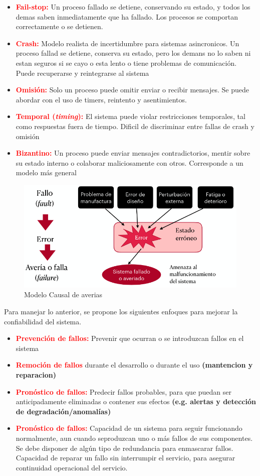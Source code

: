 \begin{itemize}
    \item \textcolor{red}{\textbf{Fail-stop:}} Un proceso fallado se detiene, conservando su estado, y todos los demas saben inmediatamente que ha fallado. Los procesos se comportan correctamente o se detienen.
    \item \textcolor{red}{\textbf{Crash:}} Modelo realista de incertidumbre para sistemas asincronicos. Un proceso fallad se detiene, conserva su estado, pero los demans no lo saben ni estan seguros si se cayo o esta lento o tiene problemas de comunicación. Puede recuperarse y reintegrarse al sistema
    \item \textcolor{red}{\textbf{Omisión:}} Solo un proceso puede omitir enviar o recibir mensajes. Se puede abordar con el uso de timers, reintento y asentimientos.
    \item \textcolor{red}{\textbf{Temporal (\textit{timing}):}} El sistema puede violar restricciones temporales, tal como respuestas fuera de tiempo. Dificil de discriminar entre fallas de crash y omisión
    \item \textcolor{red}{\textbf{Bizantino:}} Un proceso puede enviar mensajes contradictorios, mentir sobre su estado interno o colaborar maliciosamente con otros. Corresponde a un modelo más general
\end{itemize}

\begin{figure}[H]
    \centering
    \includegraphics[width=0.48\linewidth]{img/Modelo_Causal_de_averias.png}
    \caption{Modelo Causal de averias}\label{fig:1761579857293}
\end{figure}


Para manejar lo anterior, se propone los siguientes enfoques para mejorar la confiabilidad del sistema.

\begin{itemize}
    \item \textcolor{red}{\textbf{Prevención de fallos:}} Prevenir que ocurran o se introduzcan fallos en el sistema
    \item \textcolor{red}{\textbf{Remoción de fallos}} durante el desarrollo o durante el uso \textbf{(mantencion y reparacion)}
    \item \textcolor{red}{\textbf{Pronóstico de fallos:}} Predecir fallos probables, para que puedan ser anticipadamente eliminadas o contener sus efectos \textbf{(e.g. alertas y detección de degradación/anomalías)}
    \item \textcolor{red}{\textbf{Pronóstico de fallos:}} Capacidad de un sistema para seguir funcionando normalmente, aun cuando seproduzcan uno o más fallos de sus componentes.
    \subitem Se debe disponer de algún tipo de redundancia para enmascarar fallos.
    \subitem Capacidad de reparar un fallo sin interrumpir el servicio, para asegurar continuidad operacional del servicio.
\end{itemize}

